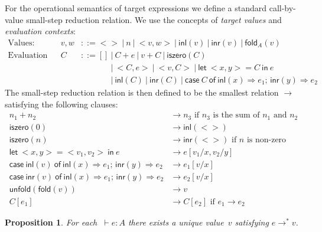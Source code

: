 \documentclass{LMCS}
\theoremstyle{definition}
\theoremstyle{plain}
\newtheorem{proposition}[thm]{Proposition}
\newcommand{\red}{\longrightarrow}
\newcommand{\kw}[1]{\mathsf{#1}}
\newcommand{\Mid}{\ \mathrel{\big|} \ }
\newcommand{\SeqTm}[3]{#1 \vdash #2 \colon #3}
\newcommand{\tlet}[3]{\kw{let}\ #2=#1\ \kw{in}\ #3}
\newcommand{\tcase}[5]{\kw{case}\ #1\ \kw{of}\ \kw{inl}(#2) \Rightarrow #3;\, \kw{inr}(#4) \Rightarrow #5}
\begin{document}
For the operational semantics of target expressions we define
a standard call-by-value small-step reduction relation. We use 
the concepts of \emph{target values} and \emph{evaluation contexts}:
\begin{align*}
   \text{Values:}&&
   v, w &::= <> 
   \Mid n
   \Mid <v, w>
   \Mid \kw{inl}(v) \Mid \kw{inr}(v) 
   \Mid \kw{fold}_A(v)
   \\
   \text{Evaluation Contexts:}&&
   C &\mathrel{::=} [] \Mid C + e
   \Mid v + C
   \Mid \kw{iszero}(C)
   \\
 &&&\mathrel{\phantom{::=}} \phantom{[]} \Mid <C, e> \Mid <v, C>
   \Mid \tlet {C} {<x, y>} {e}
   \\
   &&&\mathrel{\phantom{::=}} \phantom{[]} 
   \Mid \kw{inl}(C) \Mid \kw{inr}(C)
   \Mid \tcase {C} x {e_1} y {e_2}
\end{align*}
The small-step reduction relation is then defined to be the
smallest relation $\red$ satisfying the following clauses:
\begin{align*}
  n_1 + n_2 &\red n_3 \text{ if~$n_3$ is the sum of~$n_1$ and~$n_2$}\\
  \kw{iszero}(0) &\red \kw{inl}(<>)
  \\
  \kw{iszero}(n) &\red \kw{inr}(<>) \text{ if~$n$ is non-zero}
  \\
  \tlet{<v_1,v_2>}{<x,y>}{e} &\red e[v_1/x, v_2/y]
  \\
  \tcase{\kw{inl}(v)} x {e_1} y {e_2} &\red e_1[v/x] 
  \\
  \tcase{\kw{inr}(v)} x {e_1} y {e_2} &\red e_2[v/x] 
  \\
  \kw{unfold}(\kw{fold}(v)) & \red v
  \\
  C[e_1] &\red C[e_2] \text{ if $e_1 \red e_2$}
\end{align*}
\begin{proposition}
  For each\/ $\SeqTm{\ }{e}{A}$ there exists a unique value~$v$
  satisfying $e \red^* v$.
\end{proposition}
\end{document}
